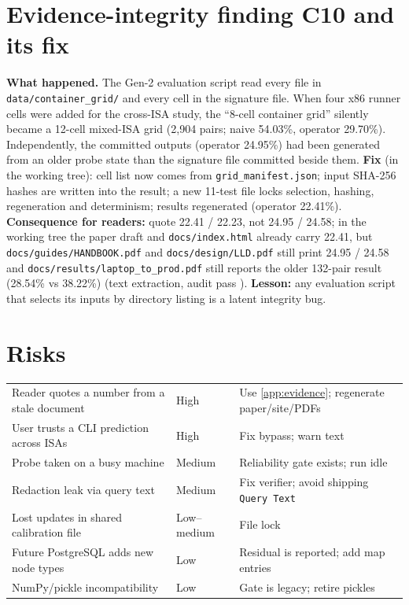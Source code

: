 \section{Evidence-integrity finding C10 and its fix}\label{sec:c10}
\textbf{What happened.} The Gen-2 evaluation script read every file in \texttt{data/container\_grid/} and every cell in the signature file. When four x86 runner cells were added for the cross-ISA study, the ``8-cell container grid'' silently became a 12-cell mixed-ISA grid (2{,}904 pairs; naive 54.03\%, operator 29.70\%). Independently, the committed outputs (operator 24.95\%) had been generated from an older probe state than the signature file committed beside them. \textbf{Fix} (in the working tree): cell list now comes from \texttt{grid\_manifest.json}; input SHA-256 hashes are written into the result; a new 11-test file locks selection, hashing, regeneration and determinism; results regenerated (operator 22.41\%). \textbf{Consequence for readers:} quote 22.41 / 22.23, not 24.95 / 24.58; in the working tree the paper draft and \texttt{docs/index.html} already carry 22.41, but \texttt{docs/guides/HANDBOOK.pdf} and \texttt{docs/design/LLD.pdf} still print 24.95 / 24.58 and \texttt{docs/results/laptop\_to\_prod.pdf} still reports the older 132-pair result (28.54\% vs 38.22\%) (text extraction, audit pass \evRUN).
\textbf{Lesson:} any evaluation script that selects its inputs by directory listing is a latent integrity bug.

\section{Risks}
\begin{center}\small
\begin{tabularx}{\textwidth}{@{}L{4.8cm}L{1.6cm}Y@{}}
\toprule {} &  & \\ \midrule
Reader quotes a number from a stale document & High & Use \cref{app:evidence}; regenerate paper/site/PDFs\\
User trusts a CLI prediction across ISAs & High & Fix bypass; warn text\\
Probe taken on a busy machine & Medium & Reliability gate exists; run idle\\
Redaction leak via query text & Medium & Fix verifier; avoid shipping \texttt{Query Text}\\
Lost updates in shared calibration file & Low--medium & File lock\\
Future PostgreSQL adds new node types & Low & Residual is reported; add map entries\\
NumPy/pickle incompatibility & Low & Gate is legacy; retire pickles\\
\bottomrule
\end{tabularx}
\end{center}

